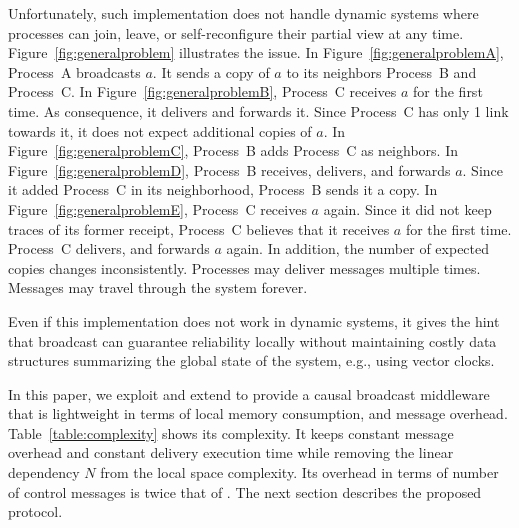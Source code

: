 Unfortunately, such implementation does not handle dynamic systems where
processes can join, leave, or self-reconfigure their partial view at any
time. Figure~\ref{fig:generalproblem} illustrates the issue. In
Figure~\ref{fig:generalproblemA}, Process~A broadcasts $a$. It sends a copy of
$a$ to its neighbors Process~B and Process~C. In
Figure~\ref{fig:generalproblemB}, Process~C receives $a$ for the first time.  As
consequence, it delivers and forwards it. Since Process~C has only 1 link
towards it, it does not expect additional copies of $a$. In
Figure~\ref{fig:generalproblemC}, Process~B adds Process~C as neighbors. In
Figure~\ref{fig:generalproblemD}, Process~B receives, delivers, and forwards
$a$. Since it added Process~C in its neighborhood, Process~B sends it a copy.
In Figure~\ref{fig:generalproblemE}, Process~C receives $a$ again. Since it did
not keep traces of its former receipt, Process~C believes that it receives $a$
for the first time. Process~C delivers, and forwards $a$ again. In addition, the
number of expected copies changes inconsistently. Processes may deliver messages
multiple times. Messages may travel through the system forever.

Even if this implementation does not work in dynamic systems, it gives the hint
that broadcast can guarantee reliability locally without maintaining costly data
structures summarizing the global state of the system, e.g., using vector
clocks.




In this paper, we exploit and extend \PCBROADCAST to provide a causal broadcast
middleware that is lightweight in terms of local memory consumption, and message
overhead. Table~\ref{table:complexity} shows its complexity. It keeps constant
message overhead and constant delivery execution time while removing the linear
dependency $N$ from the local space complexity. Its overhead in terms of number
of control messages is twice that of \PCBROADCAST.
The next section describes the proposed protocol.

